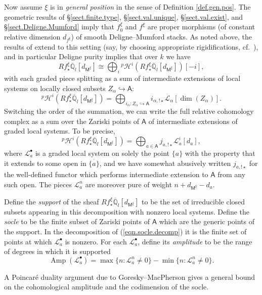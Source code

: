 \documentclass[openany]{amsbook}
\theoremstyle{definition}
\theoremstyle{remark}
\numberwithin{equation}{section}
\newcommand{\Q}{\mathbb{Q}}
\newcommand{\cL}{\mathcal{L}}
\newcommand{\ol}[1]{\overline{#1}}
\renewcommand{\-}{\operatorname{-}}
\newcommand{\Amp}{\operatorname{Amp}}
\newcommand{\pHi}{{}^p \mathcal{H}^i}
\newcommand{\bM}{\mathsf{M}}
\newcommand{\bA}{\mathsf{A}}
\begin{document}
Now assume $\xi$ is in \emph{general position} in the sense of Definition \ref{def.gen.pos}. The geometric results of \S \ref{sect.finite.type}, \S \ref{sect.val.unique}, \S \ref{sect.val.exist}, and \S \ref{sect.Deligne.Mumford} imply that $f^\xi_0$ and $f^\xi$ are proper morphisms (of constant relative dimension $d_{f^{\xi}}$) of smooth Deligne--Mumford stacks. As noted above, the results of \cite{bbdg} extend to this setting (say, by choosing appropriate rigidifications, cf.\ \cite[\S 6.2, \S 7.8]{ngofl}), and in particular Deligne purity implies that over $k$ we have
$$
R f_\star^\xi \ol{\Q}_l[d_{\bM^{\xi}}] \cong \bigoplus_i \pHi(Rf_\star^\xi \ol{\Q}_l[d_{\bM^{\xi}}])[-i],
$$
with each graded piece splitting as a sum of intermediate extensions of local systems on locally closed subsets $Z_\alpha \hookrightarrow \bA$:
$$
    \pHi(Rf_\star^\xi \ol{\Q}_l[d_{\bM^{\xi}}]) = \bigoplus_{i_\alpha : Z_\alpha \hookrightarrow \bA} i_{\alpha,!\star} \cL_\alpha[\dim(Z_\alpha)].
$$
Switching the order of the summation, we can write the full relative cohomology complex as a sum over the Zariski points of $\bA$ of intermediate extensions of graded local systems. To be precise, 
\begin{equation}
    \pHi(Rf_\star^\xi \ol{\Q}_l[d_{\bM^\xi}]) = \bigoplus_{a \in \bA} j_{a,!\star} \cL_a^i[d_a],\label{eqn.socle.decomp}
\end{equation}
where $\cL_a^{\bullet}$ is a graded local system on solely the point $\{a\}$ with the property that it extends to some open in $\ol{\{a\}}$, and we have somewhat abusively written $j_{a, !\star}$ for the well-defined functor which performs intermediate extension to $\bA$ from any such open. The pieces $\cL_a^{n}$ are moreover pure of weight $n + d_{\bM^{\xi}} - d_a$. 

Define the \emph{support} of the sheaf $Rf_\star^\xi \ol{\Q}_l[d_{\bM^\xi}]$ to be the set of irreducible closed subsets appearing in this decomposition with nonzero local systems. Define the \emph{socle} to be the finite subset of Zariski points of $\bA$ which are the generic points of the support. In the decomposition of (\ref{eqn.socle.decomp}) it is the finite set of points at which $\cL_a^\bullet$ is nonzero. For each $\cL_a^{\bullet}$, define its \emph{amplitude} to be the range of degrees in which it is supported
$$
    \Amp(\cL_a^{\bullet}) = \max \{n : \cL_a^n \neq 0\} - \min \{n : \cL_a^n \neq 0\}.
$$

A Poincar\'e duality argument due to Goresky--MacPherson gives a general bound on the cohomological amplitude and the codimension of the socle.
\end{document}

